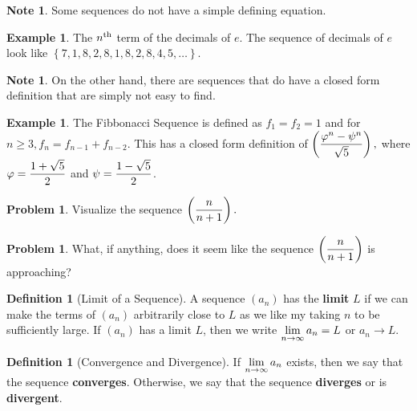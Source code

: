 \documentclass[letterpaper, twoside, 12pt]{book}
\theoremstyle{definition}
\theoremstyle{definition}
\newtheorem{definition}[theorem]{Definition}
\newtheorem{problem}[theorem]{Problem}
\newtheorem{example}[theorem]{Example}
\newtheorem{note}[theorem]{Note}
\newcommand{\ds}{\ensuremath{\displaystyle}}
\begin{document}
\vfill

\newpage

\begin{note}
 Some sequences do not have a simple defining equation.
\end{note}

\begin{example}
 The $n^{\rm th}$ term of the decimals of $e$.  The sequence of decimals of $e$ look like $\left\{ 7,1,8,2,8,1,8,2,8,4,5, \ldots \right\}$.
\end{example}

\begin{note}
 On the other hand, there are sequences that do have a closed form definition that are simply not easy to find.
\end{note}

\begin{example}
 The Fibbonacci Sequence is defined as $f_1 = f_2 = 1$ and for $n \geq 3, f_n = f_{n-1} + f_{n-2}$.  This has a closed form definition of $\ds \left( \frac{\varphi^n - \psi^n}{\sqrt{5}} \right),$ where $\ds \varphi = \frac{1+\sqrt{5}}{2}$ and $\ds \psi = \frac{1-\sqrt{5}}{2}$.
\end{example}

\begin{problem}
 Visualize the sequence $\ds \left(\frac{n}{n+1}\right).$
\end{problem}

\vfill

\begin{problem}
 What, if anything, does it seem like the sequence $\ds \left(\frac{n}{n+1}\right)$ is approaching?
\end{problem}

\vfill

\newpage

\begin{definition}[Limit of a Sequence]
 A sequence $\left(a_n\right)$ has the \textbf{limit} $L$ if we can make the
 terms of $\left(a_n\right)$ arbitrarily close to $L$ as we like my taking $n$
 to be sufficiently large.  If $\left(a_n\right)$ has a limit $L$, then we write
 $\ds \lim_{n \rightarrow \infty} a_n = L$ or $a_n\rightarrow L$.
\end{definition}

\begin{definition}[Convergence and Divergence]
 If $\ds \lim_{n \rightarrow \infty} a_n$ exists, then we say that the sequence \textbf{converges}.  Otherwise, we say that the sequence \textbf{diverges} or is \textbf{divergent}.
\end{definition}
\end{document}
